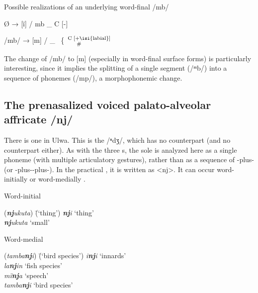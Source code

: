 \ea%
    \label{ex:phon:16}
          Possible realizations of an underlying word-final /mb/

\ea Ø → [ï] / mb \_ C [-]

\ex /mb/ → [m] / \_ \ \{ $\genfrac{}{}{0pt}{}{\textrm{C [+\isi{labial}]}}{\textrm{\#}\>\>\>\>\>\>\>\>\>\>\>\>\>\>\>\>}$
    \z
\z

The change of /mb/ to [m] (especially in word-final surface forms) is particularly interesting, since it implies the splitting of a single segment (/ᵐb/) into a sequence of phonemes (/mp/), a morphophonemic change.


\subsection{The prenasalized voiced palato-alveolar affricate /nj/}\label{sec:2.1.3}


There is one  in Ulwa. This is the     /ⁿdʒ/, which has no   counterpart (and no   counterpart \mbox{either)}. As with the three   s, the sole   is analyzed here as a single phoneme (with multiple articulatory gestures), rather than as a sequence of -plus- (or -plus--plus-). In the practical , it is written as <nj>. It can occur word-initially  or word-medially .

\ea%
    \label{ex:phon:17}
          Word-initial \\
\begin{tabbing}
{(\textit{\textbf{nj}ukuta})} \= {(‘thing’)}\kill
{\textit{\textbf{nj}i}} \> {‘thing’}\\
{\textit{\textbf{nj}ukuta}} \> {‘small’}
\end{tabbing}
\z

\ea%
    \label{ex:phon:18}
          Word-medial \\
\begin{tabbing}
{(\textit{tamba\textbf{nj}i})} \= {(‘bird species’)}\kill
{\textit{i\textbf{nj}i}} \> {‘innards’}\\
{\textit{la\textbf{nj}in}} \> {‘fish species’}\\
{\textit{mï\textbf{nj}a}} \> {‘speech’}\\
{\textit{tamba\textbf{nj}i}} \> {‘bird species’}
\end{tabbing}
\z

